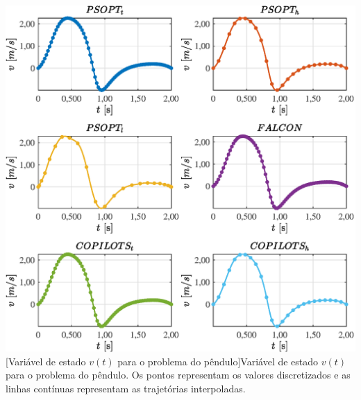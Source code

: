 \noindent
\begin{minipage}{\textwidth}
	\vspace{\onelineskip}
	\centering
	\includegraphics[scale=0.7]{fig/resultados/penduloInvertido/traj/x/v}
	[Variável de estado $v(t)$ para o problema do pêndulo]{Variável de estado $v(t)$ para o problema do pêndulo. Os pontos representam os valores discretizados e as linhas contínuas representam as trajetórias interpoladas.}
	\label{fig:penduloInvertido:x:v}
	\vspace{\onelineskip}
\end{minipage}

